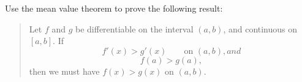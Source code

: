 \documentclass{ximera}
\author{Steven Gubkin}
\begin{document}
\begin{exercise}



Use the mean value theorem to prove the following result:

\begin{quote}
  Let $f$ and $g$ be differentiable on the interval $(a,b)$, and
  continuous on $[a,b]$. If
  \[
  f'(x)>g'(x) \qquad \text{on $(a,b)$}, and
  \]
  \[
  f(a)>g(a),
  \]
  then we must have $f(x)>g(x)$ on $(a,b)$.
\end{quote}

\end{exercise}
\end{document}
